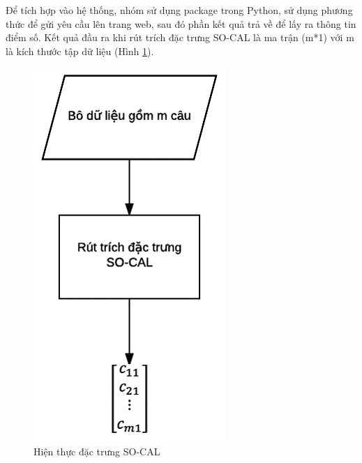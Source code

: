 Để tích hợp vào hệ thống, nhóm sử dụng package  trong Python, sử dụng phương thức  để gửi yêu cầu lên trang web, sau đó  phần kết quả trả về để lấy ra thông tin điểm số. Kết quả đầu ra khi rút trích đặc trưng SO-CAL là ma trận (m*1) với m là kích thước tập dữ liệu (Hình \ref{fig:hien-thuc-socal}).
\begin{figure}
\centering
\includegraphics[scale=0.5]{../hinh/hien_thuc_socal.png}
\caption{Hiện thực đặc trưng SO-CAL} \label{fig:hien-thuc-socal}
\end{figure}
